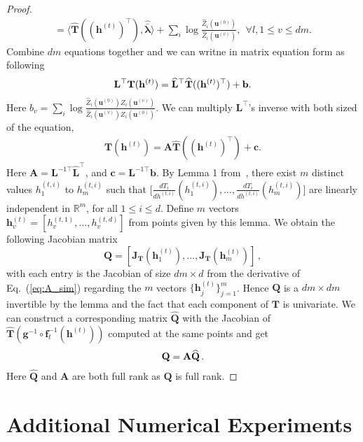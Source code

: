 \documentclass[twoside]{article}
\begin{document}
\begin{proof}
\begin{align}
=\langle \widehat{\mathbf{T}}((\mathbf{h}^{(t)})^\top), \widehat{\bar{\mathbf{\lambda}}}	\rangle + \sum_i\log \frac{\widehat{Z}_i(\mathbf{u}^{(0)})}{\widehat{Z}_i(\mathbf{u}^{(v)})}, \ \ \forall l, 1 \leq v \leq dm .
\end{align}
Combine $dm$ equations together and we can writne in matrix equation form as following
\begin{align} \notag
\mathbf{L}^{\top}\mathbf{T}(\mathbf{h}^{(t)}) = \widehat{\mathbf{L}}^{\top}\widehat{\mathbf{T}}((\mathbf{h}^{(t)})^\top) + \mathbf{b}.
\end{align}
Here $b_v=\sum_i\log \frac{\widehat{Z}_i(\mathbf{u}^{(0)}) Z_i(\mathbf{u}^{(v)}) }{\widehat{Z}_i(\mathbf{u}^{(v)}) Z_i(\mathbf{u}^{(0)}) }$. We can multiply $\mathbf{L}^{\top}$'s inverse with both sized of the equation, 
\begin{align}\label{eq:A_sim}
\mathbf{T}(\mathbf{h}^{(t)}) = \mathbf{A}\widehat{\mathbf{T}}((\mathbf{h}^{(t)})^\top) + \mathbf{c}.
\end{align}
Here $\mathbf{A} = \mathbf{L}^{-1\top} \widehat{\mathbf{L}}^{\top} $, and $\mathbf{c} = \mathbf{L}^{-1\top} \mathbf{b}$. 
By Lemma 1 from~\cite{Khemakhem20a}, there exist $m$ distinct values $h^{(t,i)}_{1}$ to $h^{(t,i)}_{m}$ such that $\big[ \frac{d T_i}{ d h^{(t,i)}}(h^{(t,i)}_{1}), ...,  \frac{d T_i}{ d h^{(t,i)}}(h^{(t,i)}_{m}) \big]$ are linearly independent in $\mathbb{R}^m$, for all $1\leq i \leq d$. 
Define $m$ vectors $\mathbf{h}^{(t)}_{v}= [h^{(t,1)}_v, ..., h^{(t,d)}_v]$ from points given by this lemma. 
We obtain the following Jacobian matrix 
$$\mathbf{Q}= [\mathbf{J}_{\mathbf{T}}(\mathbf{h}^{(t)}_1), ..., \mathbf{J}_{\mathbf{T}}(\mathbf{h}^{(t)}_m)] \, ,$$ 
with each entry is the Jacobian of size $dm \times d$ from the derivative of Eq.~(\ref{eq:A_sim}) regarding the $m$ vectors $\{\mathbf{h}^{(t)}_j\}_{j=1}^m$. 
Hence $\mathbf{Q}$ is a $dm \times dm$ invertible by the lemma and the fact that each component of $\mathbf{T}$ is univariate. 
We can construct a corresponding matrix $\widehat{\mathbf{Q}}$ with the Jacobian of $\widehat{\mathbf{T}}(\mathbf{g}^{-1}\circ \mathbf{f}_t^{-1}(\mathbf{h}^{(t)}))$ computed at the same points and get 
\begin{align} \notag
\mathbf{Q} = \mathbf{A}\widehat{\mathbf{Q}} \,.
\end{align}
Here $\widehat{\mathbf{Q}}$ and $\mathbf{A}$ are both full rank as $\mathbf{Q}$ is full rank.
\end{proof}

\section{Additional Numerical Experiments}
\end{document}
